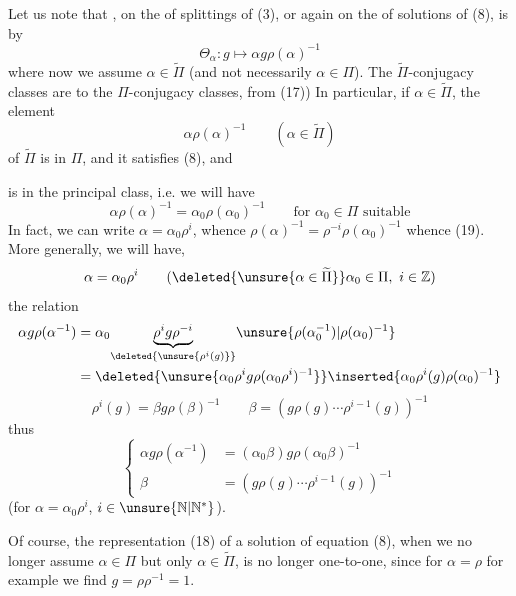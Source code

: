 Let us note that \deleted{\unsure{$\rho$}}, on the  of splittings of (3), or again on the  of solutions of (8), is   by
\[
\Theta_\alpha:g\longmapsto\alpha g\rho(\alpha)^{-1} \tag{10}
\]
where now we assume $\alpha\in\widetilde\Pi$ (and not necessarily $\alpha\in\Pi$). The $\widetilde\Pi$-conjugacy classes are  to the $\Pi$-conjugacy classes,   from (17))  In particular, if $\alpha\in\widetilde\Pi$, the element
\[
\alpha\rho(\alpha)^{-1}\qquad(\alpha\in\widetilde\Pi) \tag{18}
\]
of $\widetilde\Pi$ is in $\Pi$, and it  satisfies (8), and


is in the principal class, i.e. we will have
\[
\alpha\rho(\alpha)^{-1}=\alpha_0\rho(\alpha_0)^{-1}\qquad\text{for }\alpha_0\in\Pi\text{ suitable}
\]
In fact, we can write $\alpha=\alpha_0\rho^i$, whence $\rho(\alpha)^{-1}=\rho^{-i}\rho(\alpha_0)^{-1}$ whence (19). More generally, we will have, 
\[
\alpha=\alpha_0\rho^i\qquad(\deleted{\unsure{\alpha\in\widetilde\Pi}}\alpha_0\in\Pi,\ i\in\mathbb Z)
\]
the relation
\[
\begin{aligned}
\alpha g\rho(\alpha^{-1})
&=\alpha_0\underset{\deleted{\unsure{\rho^i(g)}}}{\underbrace{\rho^i g\rho^{-i}}}\unsure{\rho(\alpha_0^{-1})|\rho(\alpha_0)^{-1}}\\
&=\deleted{\unsure{\alpha_0\rho^i g\rho(\alpha_0\rho^i)^{-1}}}\inserted{\alpha_0\rho^i(g)\rho(\alpha_0)^{-1}}
\end{aligned}
\]
\[
\rho^i(g)=\beta g\rho(\beta)^{-1}\qquad
\beta=(g\rho(g)\cdots\rho^{i-1}(g))^{-1}
\]
thus
\[
\left\{\begin{aligned}
\alpha g\rho(\alpha^{-1})&=(\alpha_0\beta)g\rho(\alpha_0\beta)^{-1}\\
\beta&=(g\rho(g)\cdots\rho^{i-1}(g))^{-1}
\end{aligned}\right. \tag{19}
\]
(for $\alpha=\alpha_0\rho^i$, $i\in\unsure{\mathbb N|\mathbb N^*}$).

Of course, the representation (18) of a solution of equation (8),  when we no longer assume $\alpha\in\Pi$ but only $\alpha\in\widetilde\Pi$, is no longer one-to-one, since for $\alpha=\rho$ for example we find  $g=\rho\rho^{-1}=1$.

